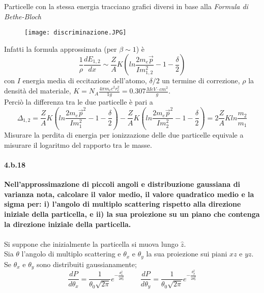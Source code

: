 \documentclass[twoside]{article}
\begin{document}
Particelle con la stessa energia tracciano grafici diversi in base alla \textit{Formula di Bethe-Bloch}

\begin{figure}[H]
    \centering
    \texttt{[image: discriminazione.JPG]}

\end{figure}
Infatti la formula approssimata (per $\beta \sim 1$) è
\begin{equation}
    \frac{1}{\rho}\frac{dE_{1,2}}{dx}\sim\frac{Z}{A} K \left(ln\frac{2m_e  \vec{p}}{I m_{1,2}^2}-1-\frac{\delta}{2} \right)
\end{equation}
con $I$ energia media di eccitazione dell'atomo, $\delta/2$ un termine di correzione, $\rho$ la densità del materiale, $K=N_A\frac{4\pi m_e c^2 r_e^2}{1g}=0.307 \frac{MeV \cdot cm^2}{g}$.
\\
Perciò la differenza tra le due particelle è pari a
\begin{equation}
    \Delta_{1,2}=\frac{Z}{A}K\left( ln\frac{2 m_e  \vec{p}^2}{Im_{1}^2}-1-\frac{\delta}{2} \right) - \frac{Z}{A}K\left( ln\frac{2 m_e  \vec{p}^2}{Im_2^2}-1-\frac{\delta}{2} \right)=2\frac{Z}{A}Kln \frac{m_2}{m_1}
\end{equation}
Misurare la perdita di energia per ionizzazione delle due particelle equivale a misurare il logaritmo del rapporto tra le masse.




\paragraph{4.b.18}\textbf{Nell'approssimazione di piccoli angoli e distribuzione gaussiana di varianza nota, calcolare il valor medio, il valore quadratico medio e la sigma per: i) l'angolo di multiplo scattering rispetto alla direzione iniziale della particella, e ii) la sua proiezione su un piano che contenga la direzione iniziale della particella.} \\ \\
Si suppone che inizialmente la particella si muova lungo $\hat{z}$.
\\
Sia $\theta$ l'angolo di multiplo scattering e $\theta_x$ e $\theta_y$ la sua proiezione sui piani $xz$ e $yz$.
\\
Se $\theta_x$ e $\theta_y$ sono distribuiti gaussianamente;
\begin{equation}
    \frac{dP}{d\theta_x}=\frac{1}{\theta_0\sqrt{2\pi}}e^{-\frac{\theta_x^2}{2\theta_0^2}} \ \ \ \ \ \ \ \ \ \ \frac{dP}{d\theta_y}=\frac{1}{\theta_0\sqrt{2\pi}}e^{-\frac{\theta_y^2}{2\theta_0^2}}
\end{equation}
\end{document}
